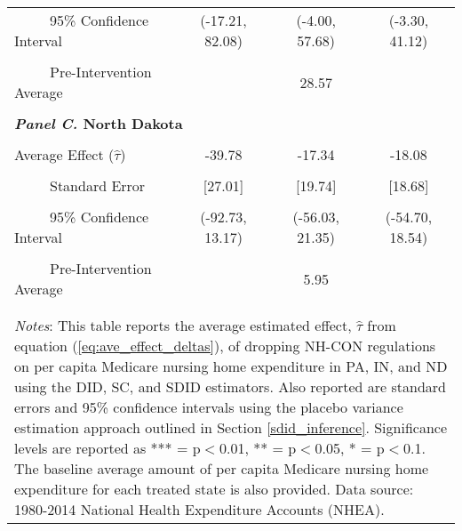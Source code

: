 \documentclass[12pt]{article}
\begin{document}
\begin{table}[htbp]
\begin{tabular}{l*{3}{c}}
\\[-2ex]
\multicolumn{1}{l}{\ \ \ \ \ 95\% Confidence Interval}&   \multicolumn{1}{c}{(-17.21, 82.08)}&   \multicolumn{1}{c}{(-4.00, 57.68)}&   \multicolumn{1}{c}{(-3.30, 41.12)}\\
\\[-2ex]
\multicolumn{1}{l}{\ \ \ \ \ Pre-Intervention Average}&   \multicolumn{3}{c}{28.57}\\
\\[-.1ex]
\multicolumn{4}{l}{\textbf{\textit{Panel C.} North Dakota}}\\
\\[-1.5ex]
\multicolumn{1}{l}{Average Effect ($\hat{\tau}$)}&   \multicolumn{1}{c}{-39.78} &   \multicolumn{1}{c}{-17.34}&  \multicolumn{1}{c}{-18.08}\\
\\[-2ex]
\multicolumn{1}{l}{\ \ \ \ \ Standard Error}  &\multicolumn{1}{c}{[27.01]}&\multicolumn{1}{c}{[19.74]}&\multicolumn{1}{c}{[18.68]}\\
\\[-2ex]
\multicolumn{1}{l}{\ \ \ \ \ 95\% Confidence Interval}&   \multicolumn{1}{c}{(-92.73, 13.17)}&   \multicolumn{1}{c}{(-56.03, 21.35)}&   \multicolumn{1}{c}{(-54.70, 18.54)}\\
\\[-2ex]
\multicolumn{1}{l}{\ \ \ \ \ Pre-Intervention Average}&   \multicolumn{3}{c}{5.95}\\
\\[-.1ex]
\hline\hline
\\[-2ex]
\multicolumn{4}{p{.8\linewidth}}{\footnotesize \textit{Notes}: This table reports the average estimated effect, $\hat{\tau}$ from equation (\ref{eq:ave_effect_deltas}), of dropping NH-CON regulations on per capita Medicare nursing home expenditure in PA, IN, and ND using the DID, SC, and SDID estimators. Also reported are standard errors and 95\% confidence intervals using the placebo variance estimation approach outlined in Section \ref{sdid_inference}. Significance levels are reported as *** = p$<$0.01, ** = p$<$0.05, * = p$<$0.1. The baseline average amount of per capita Medicare nursing home expenditure for each treated state is also provided. Data source: 1980-2014 National Health Expenditure Accounts (NHEA).}
\end{tabular}
\end{table}
\vfill
\end{document}
